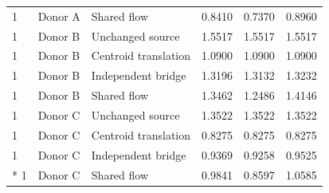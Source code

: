 {\begin{longtable}{@{}p{17mm}p{24mm}p{48mm}p{24mm}p{24mm}p{24mm}@{}}
1 & Donor A & Shared flow & 0.8410 & 0.7370 & 0.8960 \\
1 & Donor B & Unchanged source & 1.5517 & 1.5517 & 1.5517 \\
1 & Donor B & Centroid translation & 1.0900 & 1.0900 & 1.0900 \\
1 & Donor B & Independent bridge & 1.3196 & 1.3132 & 1.3232 \\
1 & Donor B & Shared flow & 1.3462 & 1.2486 & 1.4146 \\
1 & Donor C & Unchanged source & 1.3522 & 1.3522 & 1.3522 \\
1 & Donor C & Centroid translation & 0.8275 & 0.8275 & 0.8275 \\
1 & Donor C & Independent bridge & 0.9369 & 0.9258 & 0.9525 \\*
1 & Donor C & Shared flow & 0.9841 & 0.8597 & 1.0585 \\
\end{longtable}
}

